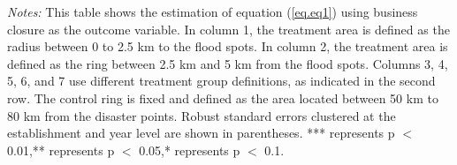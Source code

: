 \begin{table}[htb]
{\begin{threeparttable}
\begin{tabular}{lccccccccccccccc}
\bottomrule
    \end{tabular}%
        \begin{tablenotes}[flushleft] \item \small \textit{Notes:} This table shows the estimation of equation (\ref{eq.eq1}) using business closure as the outcome variable. In column 1, the treatment area is defined as the radius between 0 to 2.5 km to the flood spots. In column 2, the treatment area is defined as the ring between 2.5 km and 5 km from the flood spots. Columns 3, 4, 5, 6, and 7 use different treatment group definitions, as indicated in the second row. The control ring is fixed and defined as the area located between 50 km to 80 km from the disaster points. Robust standard errors clustered at the establishment and year level are shown in parentheses. *** represents p $<$ 0.01,** represents p $<$ 0.05,* represents p $<$ 0.1.
        \end{tablenotes}
        \end{threeparttable}
        }
\end{table}%
